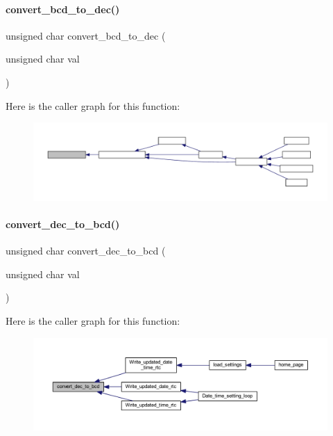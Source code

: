 \paragraph{convert\+\_\+bcd\+\_\+to\+\_\+dec()}
{\footnotesize\ttfamily unsigned char convert\+\_\+bcd\+\_\+to\+\_\+dec (\begin{DoxyParamCaption}\item[{unsigned char}]{val }\end{DoxyParamCaption})}

Here is the caller graph for this function\+:
\nopagebreak
\begin{figure}[H]
\begin{center}
\leavevmode
\includegraphics[width=350pt]{a00020_a03795fe6451769e81af8ef69856e8acb_icgraph}
\end{center}
\end{figure}
\mbox{\label{a00020_abaa7c975d4dd864dbf88ce3c10029aa4}} 
\paragraph{convert\+\_\+dec\+\_\+to\+\_\+bcd()}
{\footnotesize\ttfamily unsigned char convert\+\_\+dec\+\_\+to\+\_\+bcd (\begin{DoxyParamCaption}\item[{unsigned char}]{val }\end{DoxyParamCaption})}

Here is the caller graph for this function\+:
\nopagebreak
\begin{figure}[H]
\begin{center}
\leavevmode
\includegraphics[width=350pt]{a00020_abaa7c975d4dd864dbf88ce3c10029aa4_icgraph}
\end{center}
\end{figure}
\mbox{\label{a00020_a0975bad4a272465d34f2dd42b61929f9}} 
